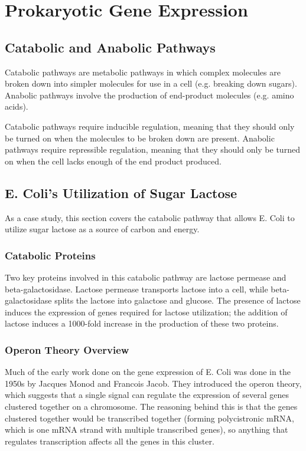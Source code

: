 \documentclass[12pt,titlepage]{article}
\begin{document}
  \newpage

  \section{Prokaryotic Gene Expression}

    \subsection{Catabolic and Anabolic Pathways}
      Catabolic pathways are metabolic pathways in which complex molecules are broken down into simpler molecules for use in a cell (e.g. breaking down sugars).
      Anabolic pathways involve the production of end-product molecules (e.g. amino acids).

      Catabolic pathways require inducible regulation, meaning that they should only be turned on when the molecules to be broken down are present. Anabolic
      pathways require repressible regulation, meaning that they should only be turned on when the cell lacks enough of the end product produced.

    \subsection{E. Coli's Utilization of Sugar Lactose}
      As a case study, this section covers the catabolic pathway that allows E. Coli to utilize sugar lactose as a source of carbon and energy.

      \subsubsection{Catabolic Proteins}
        Two key proteins involved in this catabolic pathway are lactose permease and beta-galactosidase. Lactose permease transports lactose into a cell, while
        beta-galactosidase splits the lactose into galactose and glucose. The presence of lactose induces the expression of genes required for lactose utilization;
        the addition of lactose induces a 1000-fold increase in the production of these two proteins.

      \subsubsection{Operon Theory Overview}
        Much of the early work done on the gene expression of E. Coli was done in the 1950s by Jacques Monod and Francois Jacob. They introduced the operon theory,
        which suggests that a single signal can regulate the expression of several genes clustered together on a chromosome. The reasoning behind this is that the
        genes clustered together would be transcribed together (forming polycistronic mRNA, which is one mRNA strand with multiple transcribed genes), so anything
        that regulates transcription affects all the genes in this cluster.
\end{document}

